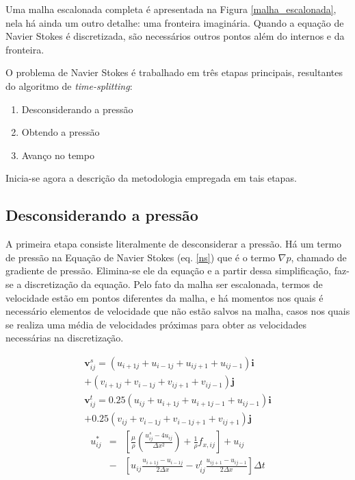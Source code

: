 \documentclass[journal]{IEEEtran}
\begin{document}
Uma malha escalonada completa é apresentada na Figura \ref{malha_escalonada}, nela há ainda um outro detalhe: uma fronteira imaginária. Quando a equação de Navier Stokes é discretizada, são necessários outros pontos além do internos e da fronteira.

O problema de Navier Stokes é trabalhado em três etapas principais, resultantes do algoritmo de \textit{time-splitting}\cite{time_splitting}:

\begin{enumerate}
  \item Desconsiderando a pressão
  \item Obtendo a pressão
  \item Avanço no tempo
\end{enumerate}

Inicia-se agora a descrição da metodologia empregada em tais etapas.

\subsection{Desconsiderando a pressão}
A primeira etapa consiste literalmente de desconsiderar a pressão. Há um termo de pressão na Equação de Navier Stokes (eq. \ref{ns}) que é o termo $\nabla p$, chamado de gradiente de pressão. Elimina-se ele da equação e a partir dessa simplificação, faz-se a discretização da equação. Pelo fato da malha ser escalonada, termos de velocidade estão em pontos diferentes da malha, e há momentos nos quais é necessário elementos de velocidade que não estão salvos na malha, casos nos quais se realiza uma média de velocidades próximas para obter as velocidades necessárias na discretização.
 
\begin{eqnarray}
\textbf{v}_{ij}^s=(u_{i+1j}+u_{i-1j}+u_{ij+1}+u_{ij-1})\textbf{i} 
\nonumber \\+(v_{i+1j}+v_{i-1j}+v_{ij+1}+v_{ij-1})\textbf{j}\\
\textbf{v}_{ij}^t=0.25(u_{ij}+u_{i+1j}+u_{i+1j-1}+u_{ij-1})\textbf{i}\nonumber \\
+0.25(v_{ij}+v_{i-1j}+v_{i-1j+1}+v_{ij+1})\textbf{j}
\end{eqnarray}
\begin{eqnarray}
u_{ij}^{*}&=&\left[\frac{\mu}{\rho}\left(\frac{u_{ij}^s-4u_{ij}}{\Delta
x^2}\right)+\frac{1}{\rho}f_{x,ij}\right] + u_{ij}\nonumber \\
&-&\left[u_{ij}\frac{u_{i+1j}-u_{i-1j}}{2\Delta
x}-v_{ij}^t\frac{u_{ij+1}-u_{ij-1}}{2\Delta x}\right]\Delta t
\end{eqnarray}
\end{document}
